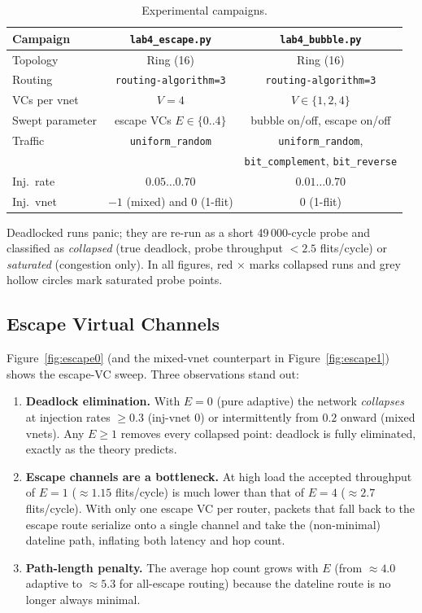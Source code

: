 \documentclass[11pt,a4paper]{article}
\begin{document}
\begin{table}[H]
  \centering
  \caption{Experimental campaigns.}
  \label{tab:setup}
  \small
  \begin{tabular}{@{}lcc@{}}
    \toprule
    Campaign & \texttt{lab4\_escape.py} & \texttt{lab4\_bubble.py} \\
    \midrule
    Topology & Ring (16) & Ring (16) \\
    Routing & \texttt{routing-algorithm=3} & \texttt{routing-algorithm=3} \\
    VCs per vnet & $V=4$ & $V \in \{1,2,4\}$ \\
    Swept parameter & escape VCs $E \in \{0..4\}$ & bubble on/off, escape on/off \\
    Traffic & \texttt{uniform\_random} & \texttt{uniform\_random}, \\
            & & \texttt{bit\_complement}, \texttt{bit\_reverse} \\
    Inj.\ rate & $0.05 \ldots 0.70$ & $0.01 \ldots 0.70$ \\
    Inj.\ vnet & $-1$ (mixed) and $0$ (1-flit) & $0$ (1-flit) \\
    \bottomrule
  \end{tabular}
\end{table}

Deadlocked runs panic; they are re-run as a short 49\,000-cycle probe and
classified as \emph{collapsed} (true deadlock, probe throughput
$<2.5$ flits/cycle) or \emph{saturated} (congestion only).  In all figures,
red $\times$ marks collapsed runs and grey hollow circles mark saturated probe
points.

\subsection{Escape Virtual Channels}
\label{sec:eval:escape}
Figure~\ref{fig:escape0} (and the mixed-vnet counterpart in
Figure~\ref{fig:escape1}) shows the escape-VC sweep.  Three observations stand
out:

\begin{enumerate}[itemsep=1pt, topsep=2pt]
  \item \textbf{Deadlock elimination.} With $E=0$ (pure adaptive) the network
        \emph{collapses} at injection rates $\ge 0.3$ (inj-vnet 0) or
        intermittently from $0.2$ onward (mixed vnets).  Any $E \ge 1$ removes
        every collapsed point: deadlock is fully eliminated, exactly as the
        theory predicts.
  \item \textbf{Escape channels are a bottleneck.} At high load the accepted
        throughput of $E=1$ ($\approx 1.15$ flits/cycle) is much lower than
        that of $E=4$ ($\approx 2.7$ flits/cycle).  With only one escape VC
        per router, packets that fall back to the escape route serialize onto
        a single channel and take the (non-minimal) dateline path, inflating
        both latency and hop count.
  \item \textbf{Path-length penalty.} The average hop count grows with $E$
        (from $\approx 4.0$ adaptive to $\approx 5.3$ for all-escape routing)
        because the dateline route is no longer always minimal.
  \end{enumerate}
\end{document}
